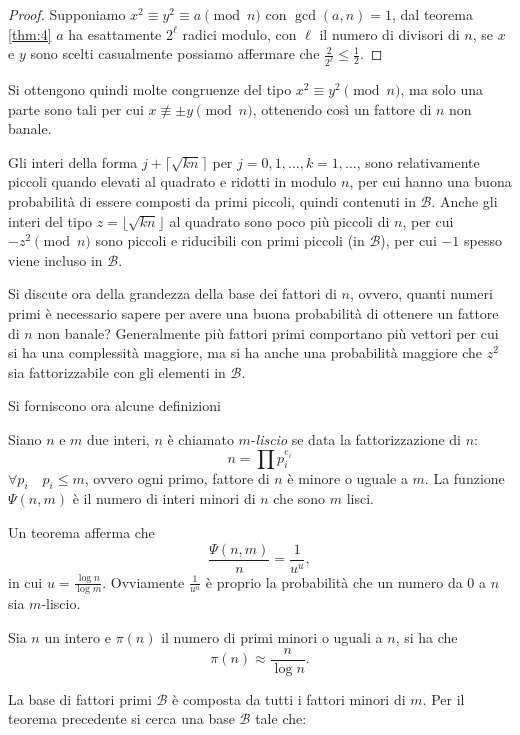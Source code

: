 \begin{proof}
    Supponiamo $x^2 \equiv y^2 \equiv a \pmod n$ con $\gcd(a,n) = 1$, dal teorema \ref{thm:4} $a$ ha esattamente $2^{\ell}$ radici modulo, con $\ell$ il numero di divisori di $n$, se $x$ e $y$ sono scelti casualmente possiamo affermare che $\frac{2}{2^\ell} \leq \frac{1}{2}$.
\end{proof}

Si ottengono quindi molte congruenze del tipo $x^2 \equiv y^2 \pmod n$, ma solo una parte sono tali per cui $x \not\equiv  \pm y \pmod n$, ottenendo così un fattore di $n$ non banale.

Gli interi della forma $j + \lceil \sqrt{kn} \rceil $ per $j = 0,1,\dots, k=1,\dots$, sono relativamente piccoli quando elevati al quadrato e ridotti in modulo $n$, per cui hanno una buona probabilità di essere composti da primi piccoli, quindi contenuti in $\mathcal{B}$. Anche gli interi del tipo $z = \lfloor \sqrt{kn} \rfloor$ al quadrato sono poco più piccoli di $n$, per cui $-z^2 \pmod n$ sono piccoli e riducibili con primi piccoli (in $\mathcal{B}$), per cui $-1$ spesso viene incluso in $\mathcal{B}$.

Si discute ora della grandezza della base dei fattori di $n$, ovvero, quanti numeri primi è necessario sapere per avere una buona probabilità di ottenere un fattore di $n$ non banale? Generalmente più fattori primi comportano più vettori per cui si ha una complessità maggiore, ma si ha anche una probabilità maggiore che $z^2$ sia fattorizzabile con gli elementi in $\mathcal{B}$.

Si forniscono ora alcune definizioni
\begin{definition}
    Siano $n$ e $m$ due interi, $n$ è chiamato $m$-\textit{liscio} se data la fattorizzazione di $n$:
    \[
        n = \prod p_i^{e_i}
    \]
    $\forall p_i \quad p_i \leq m$, ovvero ogni primo, fattore di $n$ è minore o uguale a $m$. La funzione $\Psi(n,m)$ è il numero di interi minori di $n$ che sono $m$ lisci. 
\end{definition}

Un teorema afferma che 
\[
    \frac{\Psi(n,m)}{n} = \frac{1}{u^u},
\]
in cui $u = \frac{\log n}{\log m}$. Ovviamente $\frac{1}{u^u}$ è proprio la probabilità che un numero da 0 a $n$ sia $m$-liscio.

\begin{theorem}
    Sia $n$ un intero e $\pi(n)$ il numero di primi minori o uguali a $n$, si ha che 
    \[
        \pi(n) \approx \frac{n}{\log n}.
    \]    
\end{theorem}
La base di fattori primi $\mathcal{B}$ è composta da tutti i fattori minori di $m$. Per il teorema precedente si cerca una base $\mathcal{B}$ tale che:

